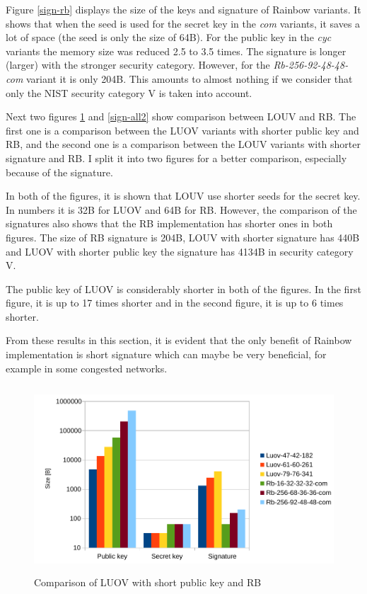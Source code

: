 \documentclass[thesis=M,english]{FITthesis}[2019/12/23]
\begin{document}
\noindent
Figure \ref{sign-rb} displays the size of the keys and signature of Rainbow variants. It shows that when the seed is used for the secret key in the \textit{com} variants, it saves a lot of space (the seed is only the size of 64B). For the public key in the \textit{cyc} variants the memory size was reduced 2.5 to 3.5 times. The signature is longer (larger) with the stronger security category. However, for the \textit{Rb-256-92-48-48-com} variant it is only 204B. This amounts to almost nothing if we consider that only the NIST security category V is taken into account. 

\bigskip
\noindent
Next two figures \ref{sign-all1} and \ref{sign-all2} show comparison between LOUV and RB. The first one is a comparison between the LUOV variants with shorter public key and RB, and the second one is a comparison between the LOUV variants with shorter signature and RB. I split it into two figures for a better comparison, especially because of the signature.

\bigskip
\noindent
In both of the figures, it is shown that LOUV use shorter seeds for the secret key. In numbers it is 32B for LUOV and 64B for RB. However, the comparison of the signatures also shows that the RB implementation has shorter ones in both figures. The size of RB signature is 204B, LOUV with shorter signature has 440B and LUOV with shorter public key the signature has 4134B in security category V. 

\bigskip
\noindent
The public key of LUOV is considerably shorter in both of the figures. In the first figure, it is up to 17 times shorter and in the second figure, it is up to 6 times shorter.

\bigskip
\noindent
From these results in this section, it is evident that the only benefit of Rainbow implementation is short signature which can maybe be very beneficial, for example in some congested networks.

\begin{figure}[H]
\centering
\includegraphics[width=13cm,height=7cm]{images/mem-sign-all1.pdf}
\caption{Comparison of LUOV with short public key and RB}
\label{sign-all1}
\end{figure}
\end{document}
